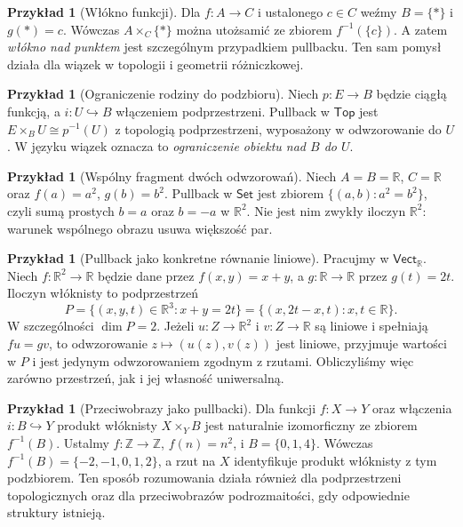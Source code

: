 \documentclass[11pt,a4paper]{article}
\numberwithin{equation}{section}
\theoremstyle{plain}
\theoremstyle{definition}
\newtheorem{przyklad}[twierdzenie]{Przykład}
\theoremstyle{remark}
\newcommand{\cat}[1]{\mathsf{#1}}
\newcommand{\Set}{\cat{Set}}
\newcommand{\Top}{\cat{Top}}
\newcommand{\Vect}{\cat{Vect}}
\begin{document}
\begin{przyklad}[Włókno funkcji]
Dla $f:A\to C$ i ustalonego $c\in C$ weźmy $B=\{*\}$ i $g(*)=c$. Wówczas $A\times_C\{*\}$ można utożsamić ze zbiorem $f^{-1}(\{c\})$. A zatem \emph{włókno nad punktem} jest szczególnym przypadkiem pullbacku. Ten sam pomysł działa dla wiązek w topologii i geometrii różniczkowej.
\end{przyklad}

\begin{przyklad}[Ograniczenie rodziny do podzbioru]
Niech $p:E\to B$ będzie ciągłą funkcją, a $i:U\hookrightarrow B$ włączeniem podprzestrzeni. Pullback w $\Top$ jest $E\times_B U\cong p^{-1}(U)$ z topologią podprzestrzeni, wyposażony w odwzorowanie do $U$. W języku wiązek oznacza to \emph{ograniczenie obiektu nad $B$ do $U$}.
\end{przyklad}

\begin{przyklad}[Wspólny fragment dwóch odwzorowań]
Niech $A=B=\mathbb R$, $C=\mathbb R$ oraz $f(a)=a^2$, $g(b)=b^2$. Pullback w $\Set$ jest zbiorem $\{(a,b):a^2=b^2\}$, czyli sumą prostych $b=a$ oraz $b=-a$ w $\mathbb R^2$. Nie jest nim zwykły iloczyn $\mathbb R^2$: warunek wspólnego obrazu usuwa większość par.
\end{przyklad}


\begin{przyklad}[Pullback jako konkretne równanie liniowe]
Pracujmy w $\Vect_{\mathbb R}$. Niech $f:\mathbb R^2\to\mathbb R$ będzie dane przez $f(x,y)=x+y$, a $g:\mathbb R\to\mathbb R$ przez $g(t)=2t$. Iloczyn włóknisty to podprzestrzeń
\[
P=\{(x,y,t)\in\mathbb R^3:x+y=2t\}=\{(x,2t-x,t):x,t\in\mathbb R\}.
\]
W szczególności $\dim P=2$. Jeżeli $u:Z\to\mathbb R^2$ i $v:Z\to\mathbb R$ są liniowe i spełniają $fu=gv$, to odwzorowanie $z\mapsto(u(z),v(z))$ jest liniowe, przyjmuje wartości w $P$ i jest jedynym odwzorowaniem zgodnym z rzutami. Obliczyliśmy więc zarówno przestrzeń, jak i jej własność uniwersalną.
\end{przyklad}

\begin{przyklad}[Przeciwobrazy jako pullbacki]
Dla funkcji $f:X\to Y$ oraz włączenia $i:B\hookrightarrow Y$ produkt włóknisty $X\times_Y B$ jest naturalnie izomorficzny ze zbiorem $f^{-1}(B)$. Ustalmy $f:\mathbb Z\to\mathbb Z$, $f(n)=n^2$, i $B=\{0,1,4\}$. Wówczas $f^{-1}(B)=\{-2,-1,0,1,2\}$, a rzut na $X$ identyfikuje produkt włóknisty z tym podzbiorem. Ten sposób rozumowania działa również dla podprzestrzeni topologicznych oraz dla przeciwobrazów podrozmaitości, gdy odpowiednie struktury istnieją.
\end{przyklad}
\end{document}
